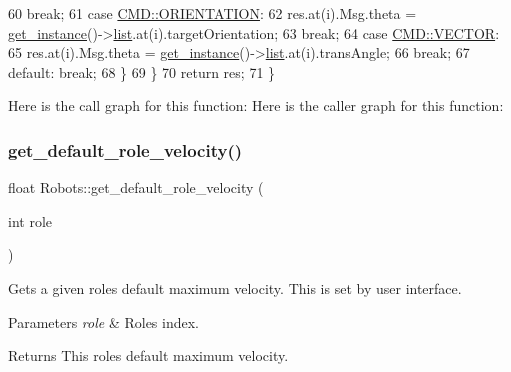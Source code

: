 \begin{DoxyCode}
60                 \textcolor{keywordflow}{break};
61             \textcolor{keywordflow}{case} \hyperlink{serial_w_8hpp_ac815b03ec48abf99301f44140ff0b0a9}{CMD::ORIENTATION}:
62                 res.at(i).Msg.theta = \hyperlink{class_robots_a589bce74db5f34af384952d48435168f}{get\_instance}()->\hyperlink{class_robots_a2c6b77265028f82a4342ca1ef15ed305}{list}.at(i).targetOrientation;
63                 \textcolor{keywordflow}{break};
64             \textcolor{keywordflow}{case} \hyperlink{serial_w_8hpp_ac6e89954deaa373db52a91ac6db50884}{CMD::VECTOR}:
65                 res.at(i).Msg.theta = \hyperlink{class_robots_a589bce74db5f34af384952d48435168f}{get\_instance}()->\hyperlink{class_robots_a2c6b77265028f82a4342ca1ef15ed305}{list}.at(i).transAngle;
66                 \textcolor{keywordflow}{break};
67             \textcolor{keywordflow}{default}: \textcolor{keywordflow}{break};
68         \}
69     \}
70     \textcolor{keywordflow}{return} res;
71 \}
\end{DoxyCode}
Here is the call graph for this function\+:
Here is the caller graph for this function\+:
\mbox{\label{class_robots_a4778a7c755c5cca4b5d1e2c3b46fb314}} 
\subsubsection{\texorpdfstring{get\+\_\+default\+\_\+role\+\_\+velocity()}{get\_default\_role\_velocity()}}
{\footnotesize\ttfamily float Robots\+::get\+\_\+default\+\_\+role\+\_\+velocity (\begin{DoxyParamCaption}\item[{int}]{role }\end{DoxyParamCaption})\hspace{0.3cm}{\ttfamily [static]}}

Gets a given role\textquotesingle{}s default maximum velocity. This is set by user interface. 
\begin{DoxyParams}{Parameters}
{\em role} & Role\textquotesingle{}s index. \\
\hline
\end{DoxyParams}
\begin{DoxyReturn}{Returns}
This role\textquotesingle{}s default maximum velocity. 
\end{DoxyReturn}


